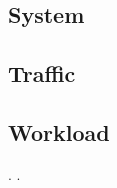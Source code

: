 \subsection{System}

\subsection{Traffic}


\subsection{Workload}
 \cite{bienia2011}.
 \cite{cpu2006}.
